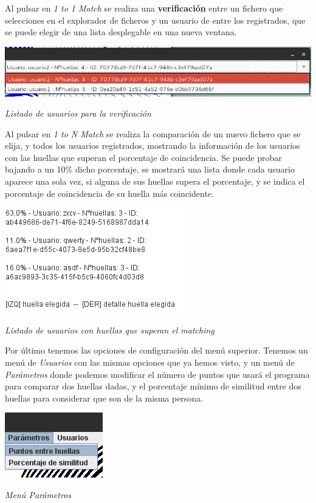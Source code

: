 \documentclass[]{article}
\begin{document}
Al pulsar en \textit{1 to 1 Match} se realiza una \textbf{verificación} entre un fichero que selecciones en el explorador de ficheros y un usuario de entre los registrados, que se puede elegir de una lista desplegable en una nueva ventana.

\begin{center}
	\includegraphics[width=1\linewidth]{images/huellas/3.png}

	\textit{Listado de usuarios para la verificación}
\end{center}

Al pulsar en \textit{1 to N Match} se realiza la comparación de un nuevo fichero que se elija, y todos los usuarios registrados, mostrando la información de los usuarios con las huellas que superan el porcentaje de coincidencia. Se puede probar bajando a un 10\% dicho porcentaje, se mostrará una lista donde cada usuario aparece una sola vez, si alguna de sus huellas supera el porcentaje, y se indica el porcentaje de coincidencia de su huella más coincidente.

\begin{center}
	\includegraphics[width=0.5\linewidth]{images/huellas/2.png}

	\textit{Listado de usuarios con huellas que superan el matching}
\end{center}


Por último tenemos las opciones de configuración del menú superior. Tenemos un menú de \textit{Usuarios} con las mismas opciones que ya hemos visto, y un menú de \textit{Parámetros} donde podemos modificar el número de puntos que usará el programa para comparar dos huellas dadas, y el porcentaje mínimo de similitud entre dos huellas para considerar que son de la misma persona.

\begin{center}
	\includegraphics[width=0.25\linewidth]{images/huellas/4.png}

	\textit{Menú Parámetros}
\end{center}
\end{document}
